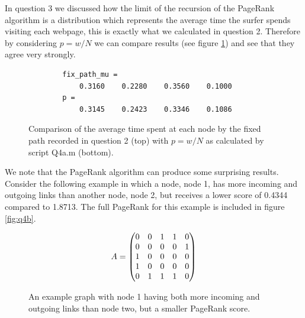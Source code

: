 \documentclass[a4paper]{article}
\begin{document}
In question 3 we discussed how the limit of the recursion of the PageRank algorithm is a distribution which represents the average time the surfer spends visiting each webpage, this is exactly what we calculated in question 2. Therefore by considering $p=w/N$ we can compare results (see figure \ref{fig:q4aa}) and see that they agree very strongly.
\begin{figure}[H]
    \centering
    \begin{verbatim}
        fix_path_mu =
            0.3160    0.2280    0.3560    0.1000
        p =
            0.3145    0.2423    0.3346    0.1086
    \end{verbatim}
    \caption{Comparison of the average time spent at each node by the fixed path recorded in question 2 (top) with $p=w/N$ as calculated by script Q4a.m (bottom).}
    \label{fig:q4aa}
\end{figure}

We note that the PageRank algorithm can produce some surprising results. Consider the following example in which a node, node 1, has more incoming and outgoing links than another node, node 2, but receives a lower score of 0.4344 compared to 1.8713. The full PageRank for this example is included in figure \ref{fig:q4b}.
\begin{figure}[H]
    \centering
    \begin{minipage}[b]{0.48\linewidth}
        \centering
        \begin{equation*}
            A = \begin{pmatrix}
                0 & 0 & 1 & 1 & 0 \\
                0 & 0 & 0 & 0 & 1 \\
                1 & 0 & 0 & 0 & 0 \\
                1 & 0 & 0 & 0 & 0 \\
                0 & 1 & 1 & 1 & 0 \\
            \end{pmatrix}
            \vspace{0.5pt}
        \end{equation*}
    \end{minipage}
    \hfill
    \begin{minipage}[b]{0.48\linewidth}
        \centering
    \end{minipage}
    \caption{An example graph with node 1 having both more incoming and outgoing links than node two, but a smaller PageRank score.}
    \label{fig:q4bb}
\end{figure}
\end{document}
